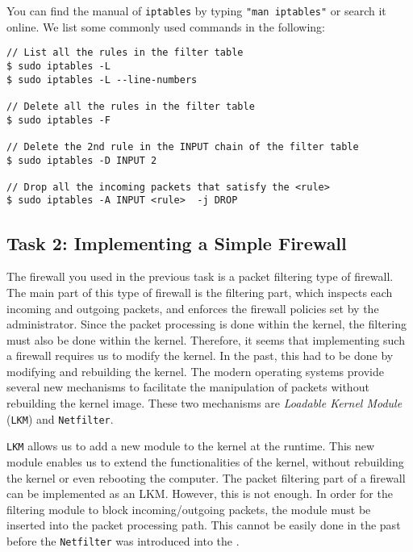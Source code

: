 You can find the manual of {\tt iptables} by typing {\tt "man iptables"} or search it
online. We list some commonly used commands 
in the following:


\begin{lstlisting}
// List all the rules in the filter table
$ sudo iptables -L
$ sudo iptables -L --line-numbers

// Delete all the rules in the filter table
$ sudo iptables -F

// Delete the 2nd rule in the INPUT chain of the filter table 
$ sudo iptables -D INPUT 2

// Drop all the incoming packets that satisfy the <rule>
$ sudo iptables -A INPUT <rule>  -j DROP
\end{lstlisting}
 


\subsection{Task 2: Implementing a Simple Firewall} 

The firewall you used in the previous task is a packet filtering 
type of firewall. The main part of this type of firewall is the filtering part, 
which inspects each incoming and outgoing packets, and enforces the firewall policies 
set by the administrator. Since the packet 
processing is done within the kernel, the filtering must also be 
done within the kernel. Therefore, it seems that implementing such
a firewall requires us to modify the \linux kernel. In the past, 
this had to be done by modifying and rebuilding 
the kernel. The modern \linux 
operating systems provide several new mechanisms 
to facilitate the manipulation of packets without rebuilding
the kernel image. These two mechanisms are 
\textit{Loadable Kernel Module} ({\tt LKM}) and {\tt Netfilter}.
 

{\tt LKM} allows us to add a new module to the kernel at the runtime. 
This new module enables us to extend the functionalities of the kernel,
without rebuilding the kernel or even rebooting the computer. 
The packet filtering part of a firewall can be implemented 
as an LKM. However, this is not enough. In order for the filtering module to 
block incoming/outgoing packets, the module 
must be inserted into the packet processing path. 
This cannot be easily done in the past before 
the {\tt Netfilter} was introduced into the \linux.


